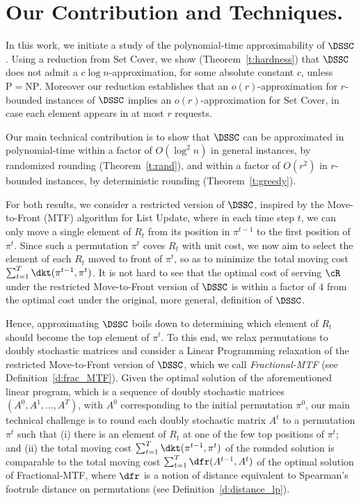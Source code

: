 \section{Our Contribution and Techniques.}
%
In this work, we initiate a study of the polynomial-time approximability of $\DSSC$. Using a reduction from Set Cover, we show (Theorem~\ref{t:hardness}) that $\DSSC$ does not admit a $c\log n$-approximation, for some absolute constant $c$, unless $\mathrm{P}=\mathrm{NP}$. Moreover our reduction establishes that an $o(r)$-approximation for $r$-bounded instances of $\DSSC$ implies an $o(r)$-approximation for Set Cover, in case each element appears in at most $r$ requests. 

Our main technical contribution is to show that $\DSSC$ can be approximated in polynomial-time within a factor of $O(\log^2 n)$ in general instances, by randomized rounding (Theorem~\ref{t:rand}), and within a factor of $O(r^2)$ in $r$-bounded instances, by deterministic rounding (Theorem~\ref{t:greedy}). %

For both results, we consider a restricted version of $\DSSC$, inspired by the Move-to-Front (MTF) algorithm for List Update, where in each time step $t$, we can only move a single element of $R_t$ from its position in $\pi^{t-1}$ to the first position of $\pi^t$. Since such a permutation $\pi^t$ coves $R_t$ with unit cost, we now aim to select the element of each $R_t$ moved to front of $\pi^t$, so as to minimize the total moving cost $\sum_{t=1}^T \dkt(\pi^{t-1}, \pi^t)$. It is not hard to see that the optimal cost of serving $\cR$ under the restricted Move-to-Front version of $\DSSC$ is within a factor of $4$ from the optimal cost under the original, more general, definition of $\DSSC$. 

Hence, approximating $\DSSC$ boils down to determining which element of $R_t$ should become the top element of $\pi^{t}$. To this end, we relax permutations to doubly stochastic matrices and consider a Linear Programming relaxation of the restricted Move-to-Front version of $\DSSC$, which we call \emph{Fractional-MTF} (see Definition~\ref{d:frac_MTF}). Given the optimal solution of the aforementioned linear program, which is a sequence of doubly stochastic matrices $(A^0, A^1, \ldots, A^T)$, with $A^0$ corresponding to the initial permutation $\pi^0$, our main technical challenge is to round each doubly stochastic matrix $A^t$ to a permutation $\pi^t$ such that (i) there is an element of $R_t$ at one of the few top positions of $\pi^t$; and (ii) the total moving cost $\sum_{t=1}^T \dkt(\pi^{t-1}, \pi^t)$ of the rounded solution is comparable to the total moving cost $\sum_{t=1}^T \dfr(A^{t-1}, A^t)$ of the optimal solution of Fractional-MTF, where $\dfr$ is a notion of distance equivalent to Spearman's footrule distance on permutations (see Definition~\ref{d:distance_lp}).

